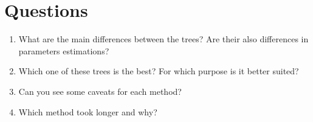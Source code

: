 \documentclass{article}\usepackage[]{graphicx}\usepackage[]{color}
\begin{document}
\section{Questions}
\begin{enumerate}
\item What are the main differences between the trees? Are their also differences in parameters estimations?
\item Which one of these trees is the best? For which purpose is it better suited?
\item Can you see some caveats for each method?
\item Which method took longer and why?
\end{enumerate}




\end{document}
